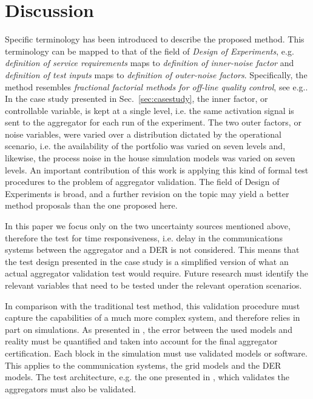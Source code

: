 \section{Discussion}
Specific terminology has been introduced to describe the proposed method. This terminology can be mapped to that of the field of \emph{Design of Experiments}, e.g. \emph{definition of service requirements} maps to \emph{definition of inner-noise factor} and \emph{definition of test inputs} maps to \emph{definition of outer-noise factors}. Specifically, the method resembles \emph{fractional factorial methods for off-line quality control}, see e.g.\cite{oehlert2010first}. In the case study presented in Sec.~\ref{sec:casestudy}, the inner factor, or controllable variable, is kept at a single level, i.e. the same activation signal is sent to the aggregator for each run of the experiment. The two outer factors, or noise variables, were varied over a distribution dictated by the operational scenario, i.e. the availability of the portfolio was varied on seven levels and, likewise, the process noise in the house simulation models was varied on seven levels. An important contribution of this work is applying this kind of formal test procedures to the problem of aggregator validation. The field of Design of Experiments is broad, and a further revision on the topic may yield a better method proposals than the one proposed here.

In this paper we focus only on the two  uncertainty sources mentioned above, therefore the test for time responsiveness, i.e. delay in the communications systems between the aggregator and a DER is not considered. This means that the test design presented in the case study is a simplified version of what an actual aggregator validation test would require. Future research must identify the relevant variables that need to be tested under the relevant operation scenarios. 

In comparison with the traditional test method, this validation procedure must capture the capabilities of a much more complex system, and therefore relies in part on simulations. As presented in \cite{steinbrink2015challenges}, the error between the used models and reality must be quantified and taken into account for the final aggregator certification. Each block in the simulation must use validated models or software. This applies to the communication systems, the grid models and the DER models. The test architecture, e.g. the one presented in \cite{buscher2015towards}, which validates the aggregators must also be validated.

